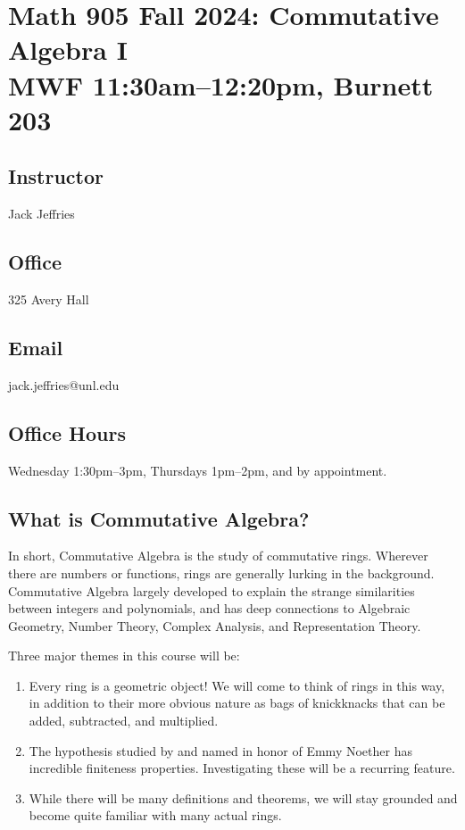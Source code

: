 \documentclass[12pt]{amsart}
\newcommand{\showsol}[1]{\def\displaysol{#1}}
\begin{document}
\showsol{0}
	
	\thispagestyle{empty}
	
	\section*{{\large Math 905 Fall 2024: Commutative Algebra I}\\ MWF 11:30am--12:20pm, Burnett 203}
	
	

	\subsection*{Instructor}  Jack Jeffries

	\subsection*{Office}  325 Avery Hall

	\subsection*{Email}   jack.jeffries@unl.edu

	\subsection*{Office Hours}  Wednesday 1:30pm--3pm, Thursdays 1pm--2pm, and by appointment.

	
	\subsection*{What is Commutative Algebra?} In short, Commutative Algebra is the study of commutative rings. Wherever there are numbers or functions, rings are generally lurking in the background. Commutative Algebra largely developed to explain the strange similarities between integers and polynomials, and has deep connections to Algebraic Geometry, Number Theory, Complex Analysis, and Representation Theory.
	
	Three major themes in this course will be:
	\begin{enumerate}
	\item Every ring is a geometric object! We will come to think of rings in this way, in addition to their more obvious nature as bags of knickknacks that can be added, subtracted, and multiplied.
	\item The hypothesis studied by and named in honor of Emmy Noether has incredible finiteness properties. Investigating these will be a recurring feature.
	\item While there will be many definitions and theorems, we will stay grounded and become quite familiar with many actual rings.
	\end{enumerate}	
\end{document}
